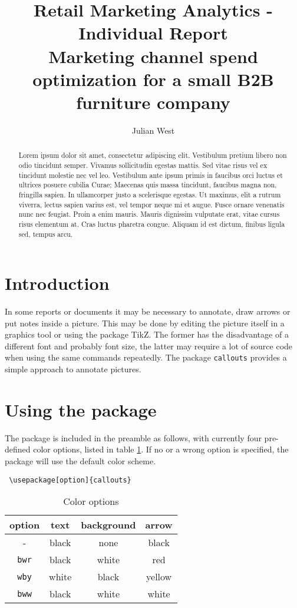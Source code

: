 \documentclass[a4paper,11pt]{article}
\title{Retail Marketing Analytics - Individual Report \\
\addlinespace
\large Marketing channel spend optimization for a small B2B furniture company}
\author{Julian West}
\begin{document}
\maketitle

\begin{abstract}
Lorem ipsum dolor sit amet, consectetur adipiscing elit. Vestibulum pretium libero non odio tincidunt semper. Vivamus sollicitudin egestas mattis. Sed vitae risus vel ex tincidunt molestie nec vel leo. Vestibulum ante ipsum primis in faucibus orci luctus et ultrices posuere cubilia Curae; Maecenas quis massa tincidunt, faucibus magna non, fringilla sapien. In ullamcorper justo a scelerisque egestas. Ut maximus, elit a rutrum viverra, lectus sapien varius est, vel tempor neque mi et augue. Fusce ornare venenatis nunc nec feugiat. Proin a enim mauris. Mauris dignissim vulputate erat, vitae cursus risus elementum at. Cras luctus pharetra congue. Aliquam id est dictum, finibus ligula sed, tempus arcu. 
\end{abstract} \hspace{10pt}

\section{Introduction}
In some reports or documents it may be necessary to annotate, draw arrows or put notes inside a picture. This may be done by editing the picture itself in a graphics tool or using the package TikZ. The former has the disadvantage of a different font and probably font size, the latter may require a lot of source code when using the same commands repeatedly. The package \texttt{callouts} provides a simple approach to annotate pictures.

\section{Using the package}

The package is included in the preamble as follows, with currently four pre-defined color options, listed in table \ref{tab:colors}. If no or a wrong option is specified, the package will use the default color scheme.

\begin{lstlisting}
 \usepackage[option]{callouts}
\end{lstlisting}

\begin{table}[htb]
 \centering
 \caption{Color options}\label{tab:colors}
 \begin{tabular}{cccc}
 \toprule
  option & text & background & arrow \\
  \midrule
  -& black & none & black \\
  \texttt{bwr}	& black & white & red \\
  \texttt{wby}	& white & black & yellow \\
  \texttt{bww}	& black & white & white\\
  \bottomrule
 \end{tabular}
\end{table}
\end{document}
